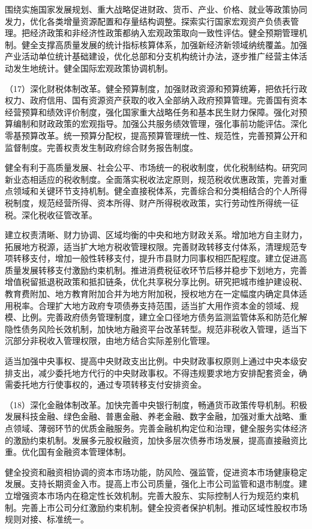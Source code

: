     围绕实施国家发展规划、重大战略促进财政、货币、产业、价格、就业等政策协同发力，优化各类增量资源配置和存量结构调整。探索实行国家宏观资产负债表管理。把经济政策和非经济性政策都纳入宏观政策取向一致性评估。健全预期管理机制。健全支撑高质量发展的统计指标核算体系，加强新经济新领域纳统覆盖。加强产业活动单位统计基础建设，优化总部和分支机构统计办法，逐步推广经营主体活动发生地统计。健全国际宏观政策协调机制。

    （17）深化财税体制改革。健全预算制度，加强财政资源和预算统筹，把依托行政权力、政府信用、国有资源资产获取的收入全部纳入政府预算管理。完善国有资本经营预算和绩效评价制度，强化国家重大战略任务和基本民生财力保障。强化对预算编制和财政政策的宏观指导。加强公共服务绩效管理，强化事前功能评估。深化零基预算改革。统一预算分配权，提高预算管理统一性、规范性，完善预算公开和监督制度。完善权责发生制政府综合财务报告制度。

    健全有利于高质量发展、社会公平、市场统一的税收制度，优化税制结构。研究同新业态相适应的税收制度。全面落实税收法定原则，规范税收优惠政策，完善对重点领域和关键环节支持机制。健全直接税体系，完善综合和分类相结合的个人所得税制度，规范经营所得、资本所得、财产所得税收政策，实行劳动性所得统一征税。深化税收征管改革。

    建立权责清晰、财力协调、区域均衡的中央和地方财政关系。增加地方自主财力，拓展地方税源，适当扩大地方税收管理权限。完善财政转移支付体系，清理规范专项转移支付，增加一般性转移支付，提升市县财力同事权相匹配程度。建立促进高质量发展转移支付激励约束机制。推进消费税征收环节后移并稳步下划地方，完善增值税留抵退税政策和抵扣链条，优化共享税分享比例。研究把城市维护建设税、教育费附加、地方教育附加合并为地方附加税，授权地方在一定幅度内确定具体适用税率。合理扩大地方政府专项债券支持范围，适当扩大用作资本金的领域、规模、比例。完善政府债务管理制度，建立全口径地方债务监测监管体系和防范化解隐性债务风险长效机制，加快地方融资平台改革转型。规范非税收入管理，适当下沉部分非税收入管理权限，由地方结合实际差别化管理。

    适当加强中央事权、提高中央财政支出比例。中央财政事权原则上通过中央本级安排支出，减少委托地方代行的中央财政事权。不得违规要求地方安排配套资金，确需委托地方行使事权的，通过专项转移支付安排资金。

    （18）深化金融体制改革。加快完善中央银行制度，畅通货币政策传导机制。积极发展科技金融、绿色金融、普惠金融、养老金融、数字金融，加强对重大战略、重点领域、薄弱环节的优质金融服务。完善金融机构定位和治理，健全服务实体经济的激励约束机制。发展多元股权融资，加快多层次债券市场发展，提高直接融资比重。优化国有金融资本管理体制。

    健全投资和融资相协调的资本市场功能，防风险、强监管，促进资本市场健康稳定发展。支持长期资金入市。提高上市公司质量，强化上市公司监管和退市制度。建立增强资本市场内在稳定性长效机制。完善大股东、实际控制人行为规范约束机制。完善上市公司分红激励约束机制。健全投资者保护机制。推动区域性股权市场规则对接、标准统一。

